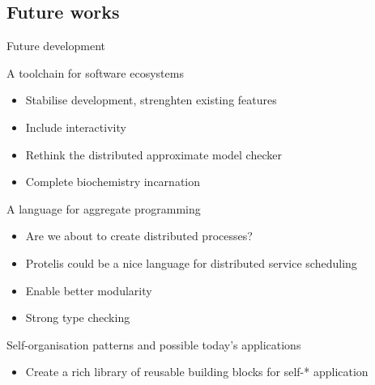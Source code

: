 \documentclass[presentation]{beamer}\mode<presentation>{\usetheme{sapere}}
\begin{document}
\subsection*{Future works}
\begin{frame}{Future development}
\begin{block}{A toolchain for software ecosystems}
\begin{itemize}
 \item Stabilise development, strenghten existing features
 \item Include interactivity
 \item Rethink the distributed approximate model checker
 \item Complete biochemistry incarnation
\end{itemize}
\end{block}
\begin{block}{A language for aggregate programming}
\begin{itemize}
 \item Are we about to create distributed processes?
 \item Protelis could be a nice language for distributed service scheduling
 \item Enable better modularity
 \item Strong type checking
\end{itemize}
\end{block}
\begin{block}{Self-organisation patterns and possible today's applications}
\begin{itemize}
  \item Create a rich library of reusable building blocks for self-* application
\end{itemize}
\end{block}
\end{frame}


\section*{\refname}
\begin{frame}[allowframebreaks]
  \frametitle{\refname}
  \scriptsize
  
  
\end{frame}
\section*{\refname}
\end{document}
